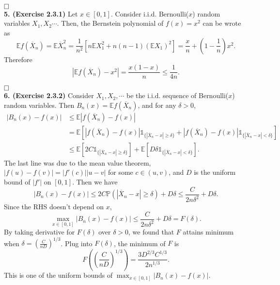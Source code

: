 \documentclass[12pt]{extarticle}
\begin{document}
$\hspace{\fill}\square$
\\
\textbf{5. (Exercise 2.3.1)}
Let $x\in[0,1]$.
Consider i.i.d. Bernoulli($x$) random variables $X_1,X_2\cdots$.
Then, the Bernstein polynomial of $f(x)=x^2$ can be wrote as
\[
\mathbb{E}f(\overline{X}_n)=\mathbb{E}\overline{X}_n^2
=\frac{1}{n^2}\left[
n\mathbb{E}X_1^2+n(n-1)\left(\mathbb{E}X_1\right)^2
\right]
=\frac{x}{n}+\left(1-\frac{1}{n}\right)x^2.
\]
Therefore
\[
\left|\mathbb{E}f(\overline{X}_n)-x^2\right|=\frac{x(1-x)}{n}\leq\frac{1}{4n}.
\]

$\hspace{\fill}\square$
\\
\textbf{6. (Exercise 2.3.2)}
Consider $X_1,X_2,\cdots$ be the i.i.d. sequence of Bernoulli($x$) random variables.
Then $B_n(x)=\mathbb{E}f(\overline{X}_n)$, and for any $\delta>0$,
\[
\begin{aligned}
|B_n(x)-f(x)|
&\leq
\mathbb{E}|f(\overline{X}_n)-f(x)|
\\&
=\mathbb{E}\left[\left|f(\overline{X}_n)-f(x)\right|\mathds{1}_{\{|\overline{X}_n-x|\geq\delta\}}
+
\left|f(\overline{X}_n)-f(x)\right|\mathds{1}_{\{|\overline{X}_n-x|<\delta\}}\right]
\\&\leq
\mathbb{E}\left[2C\mathds{1}_{\{|\overline{X}_n-x|\geq\delta\}}\right]
+
\mathbb{E}\left[D\delta\mathds{1}_{\{|\overline{X}_n-x|<\delta\}}\right].
\end{aligned}
\]
The last line was due to the mean value theorem, $|f(u)-f(v)|=|f'(c)||u-v|$ for some $c\in(u,v)$, and $D$ is the uniform bound of $|f'|$ on $[0,1]$.
Then we have
\[
|B_n(x)-f(x)|\leq 2C\mathbb{P}(|\overline{X}_n-x|\geq\delta)+D\delta
\leq \frac{C}{2n\delta^2}+D\delta.
\]
Since the RHS doesn't depend on $x$,
\[
\max_{x\in[0,1]}|B_n(x)-f(x)|\leq\frac{C}{2n\delta^2}+D\delta=F(\delta).
\]
By taking derivative for $F(\delta)$ over $\delta>0$, we found that $F$ attains minimum when $\delta=\left(\frac{C}{nD}\right)^{1/3}$. Plug into $F(\delta)$, the minimum of $F$ is
\[
F\left(\left(\frac{C}{nD}\right)^{1/3}\right)=\frac{3D^{2/3}C^{1/3}}{2n^{1/3}}.
\]
This is one of the uniform bounds of $\max_{x\in[0,1]}|B_n(x)-f(x)|$.
\end{document}

